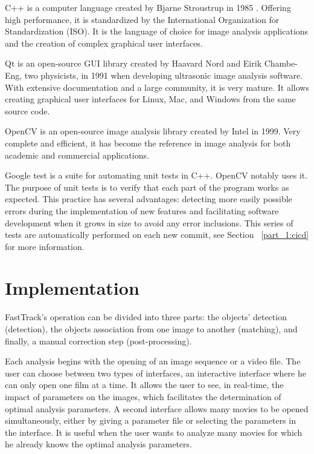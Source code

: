     C++ is a computer language created by Bjarne Stroustrup in 1985 \cite{stroustrup1996history}. Offering high performance, it is standardized by the International Organization for Standardization (ISO). It is the language of choice for image analysis applications and the creation of complex graphical user interfaces.

    Qt is an open-source GUI library created by Haavard Nord and Eirik Chambe-Eng, two physicists, in 1991 when developing ultrasonic image analysis software. With extensive documentation and a large community, it is very mature. It allows creating graphical user interfaces for Linux, Mac, and Windows from the same source code.

    OpenCV is an open-source image analysis library created by Intel in 1999. Very complete and efficient, it has become the reference in image analysis for both academic and commercial applications.

    Google test is a suite for automating unit tests in C++. OpenCV notably uses it. The purpose of unit tests is to verify that each part of the program works as expected. This practice has several advantages: detecting more easily possible errors during the implementation of new features and facilitating software development when it grows in size to avoid any error inclusions. This series of tests are automatically performed on each new commit, see Section ~\ref{part_1:cicd} for more information.

    \section{Implementation}
    FastTrack's operation can be divided into three parts: the objects' detection (detection), the objects association from one image to another (matching), and finally, a manual correction step (post-processing).

    Each analysis begins with the opening of an image sequence or a video file. The user can choose between two types of interfaces, an interactive interface where he can only open one film at a time. It allows the user to see, in real-time, the impact of parameters on the images, which facilitates the determination of optimal analysis parameters. A second interface allows many movies to be opened simultaneously, either by giving a parameter file or selecting the parameters in the interface. It is useful when the user wants to analyze many movies for which he already knows the optimal analysis parameters.

